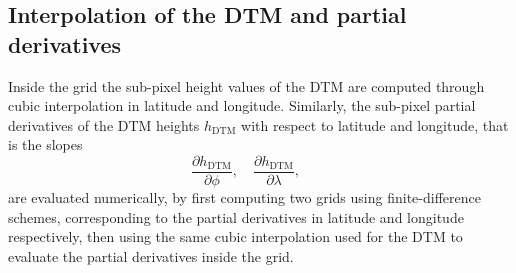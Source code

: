 \documentclass[pdflatex,sn-mathphys-num]{sn-jnl}%
\theoremstyle{thmstyleone}%
\theoremstyle{thmstyletwo}%
\theoremstyle{thmstylethree}%
\begin{document}
\subsection{Interpolation of the DTM and partial derivatives}


Inside the grid the sub-pixel height values of the DTM are computed through
cubic %
interpolation in latitude and longitude.
%
Similarly, the sub-pixel partial derivatives of the DTM heights $h_{\mathrm{DTM}}$ with respect to latitude and longitude, that is the slopes
\begin{equation}
	\frac{\partial h_{\mathrm{DTM}}}{\partial \phi}, \quad
	\frac{\partial h_{\mathrm{DTM}}}{\partial \lambda}, \qquad 
\end{equation}
are evaluated numerically, by first computing two grids using finite-difference schemes, 
corresponding to the partial derivatives in latitude and longitude respectively, then using the same cubic interpolation used for the DTM to evaluate the partial derivatives inside the grid.


\end{document}
